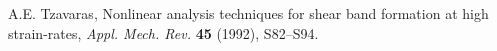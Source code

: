 \documentclass[a4paper,11pt]{article}
\theoremstyle{remark}
\begin{document}
\begin{thebibliography}{10}
{\sc A.E. Tzavaras},
Nonlinear analysis techniques for shear band formation at high strain-rates,
{\it Appl. Mech. Rev.}
{\bf  45} (1992), S82--S94.



%
%


%
%
%
%

%
%
%
%
%
%
%
%

%
%


\end{thebibliography}
\end{document}
